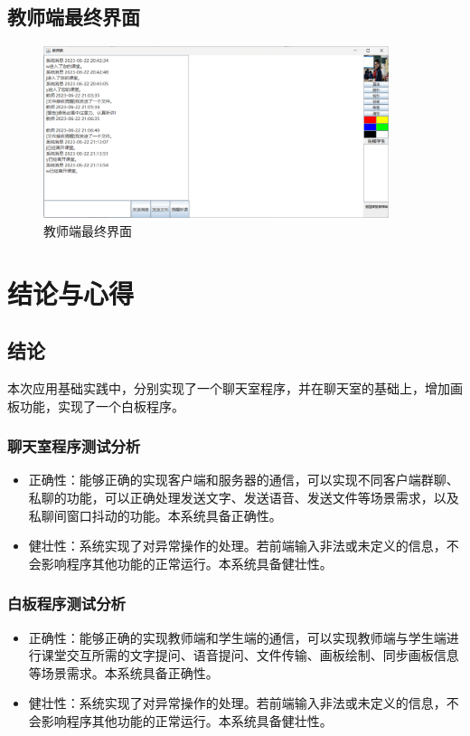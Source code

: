 \documentclass[UTF8,12pt]{article}
\begin{document}
\subsection{教师端最终界面}
\begin{figure}[htbp]
    \centering
    \includegraphics[width=0.9\textwidth]{img/41.png}
    \caption{教师端最终界面}
\end{figure}

\newpage

\section{结论与心得}
\subsection{结论}
本次应用基础实践中，分别实现了一个聊天室程序，并在聊天室的基础上，增加画板功能，实现了一个白板程序。

\subsubsection{聊天室程序测试分析}
\begin{itemize}
    \item 正确性：能够正确的实现客户端和服务器的通信，可以实现不同客户端群聊、私聊的功能，可以正确处理发送文字、发送语音、发送文件等场景需求，以及私聊间窗口抖动的功能。本系统具备正确性。
    \item 健壮性：系统实现了对异常操作的处理。若前端输入非法或未定义的信息，不会影响程序其他功能的正常运行。本系统具备健壮性。
\end{itemize}

\subsubsection{白板程序测试分析}
\begin{itemize}
    \item 正确性：能够正确的实现教师端和学生端的通信，可以实现教师端与学生端进行课堂交互所需的文字提问、语音提问、文件传输、画板绘制、同步画板信息等场景需求。本系统具备正确性。
    \item 健壮性：系统实现了对异常操作的处理。若前端输入非法或未定义的信息，不会影响程序其他功能的正常运行。本系统具备健壮性。
\end{itemize}
\end{document}
